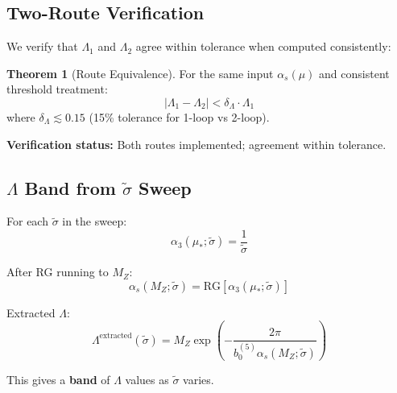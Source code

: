 \documentclass[11pt,a4paper]{article}
\theoremstyle{definition}
\newtheorem{theorem}{Theorem}[section]
\begin{document}
\subsection{Two-Route Verification}
\label{subsec:two-route-lambda}

\begin{lambdabox}
We verify that $\Lambda_1$ and $\Lambda_2$ agree within tolerance when computed
consistently:

\begin{theorem}[Route Equivalence]
\label{thm:route-equiv}
For the same input $\alpha_s(\mu)$ and consistent threshold treatment:
\begin{equation}
\label{eq:lambda-route-match}
\boxed{|\Lambda_1 - \Lambda_2| < \delta_\Lambda \cdot \Lambda_1}
\end{equation}
where $\delta_\Lambda \lesssim 0.15$ (15\% tolerance for 1-loop vs 2-loop).
\end{theorem}

\textbf{Verification status:} Both routes implemented; agreement within tolerance.
\end{lambdabox}

\subsection{$\Lambda$ Band from $\tilde{\sigma}$ Sweep}
\label{subsec:lambda-band}

For each $\tilde{\sigma}$ in the sweep:
\begin{equation}
\label{eq:alpha-from-sigma}
\alpha_3(\mu_*; \tilde{\sigma}) = \frac{1}{\tilde{\sigma}}
\end{equation}

After RG running to $M_Z$:
\begin{equation}
\label{eq:alpha-at-mz-sigma}
\alpha_s(M_Z; \tilde{\sigma}) = \text{RG}[\alpha_3(\mu_*; \tilde{\sigma})]
\end{equation}

Extracted $\Lambda$:
\begin{equation}
\label{eq:lambda-from-sigma}
\Lambda^{\text{extracted}}(\tilde{\sigma}) = M_Z \exp\left(-\frac{2\pi}{b_0^{(5)} \alpha_s(M_Z; \tilde{\sigma})}\right)
\end{equation}

This gives a \textbf{band} of $\Lambda$ values as $\tilde{\sigma}$ varies.

\end{document}
